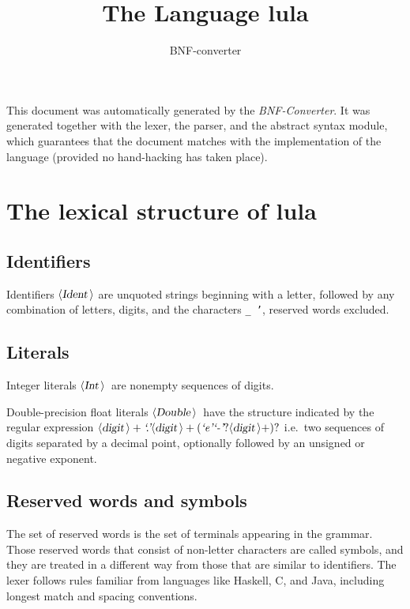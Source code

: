 \documentclass[a4paper,11pt]{article}
\author{BNF-converter}
\title{The Language lula}
\begin{document}
\maketitle

\newcommand{\emptyP}{\mbox{$\epsilon$}}
\newcommand{\terminal}[1]{\mbox{{\texttt {#1}}}}
\newcommand{\nonterminal}[1]{\mbox{$\langle \mbox{{\sl #1 }} \! \rangle$}}
\newcommand{\arrow}{\mbox{::=}}
\newcommand{\delimit}{\mbox{$|$}}
\newcommand{\reserved}[1]{\mbox{{\texttt {#1}}}}
\newcommand{\literal}[1]{\mbox{{\texttt {#1}}}}
\newcommand{\symb}[1]{\mbox{{\texttt {#1}}}}

This document was automatically generated by the {\em BNF-Converter}. It was generated together with the lexer, the parser, and the abstract syntax module, which guarantees that the document matches with the implementation of the language (provided no hand-hacking has taken place).

\section*{The lexical structure of lula}
\subsection*{Identifiers}
Identifiers \nonterminal{Ident} are unquoted strings beginning with a letter,
followed by any combination of letters, digits, and the characters {\tt \_ '},
reserved words excluded.


\subsection*{Literals}
Integer literals \nonterminal{Int}\ are nonempty sequences of digits.


Double-precision float literals \nonterminal{Double}\ have the structure
indicated by the regular expression $\nonterminal{digit}+ \mbox{{\it `.'}} \nonterminal{digit}+ (\mbox{{\it `e'}} \mbox{{\it `-'}}? \nonterminal{digit}+)?$ i.e.\
two sequences of digits separated by a decimal point, optionally
followed by an unsigned or negative exponent.




\subsection*{Reserved words and symbols}
The set of reserved words is the set of terminals appearing in the grammar. Those reserved words that consist of non-letter characters are called symbols, and they are treated in a different way from those that are similar to identifiers. The lexer follows rules familiar from languages like Haskell, C, and Java, including longest match and spacing conventions.
\end{document}
